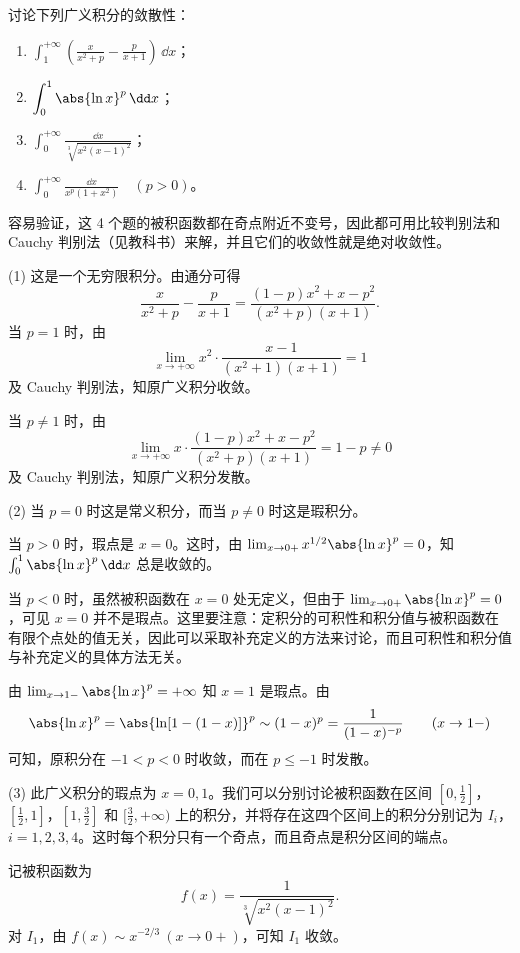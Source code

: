 \begin{xexample}[12.2.2]
讨论下列广义积分的敛散性：
\begin{enumerate}[label=(\arabic*)]
  \item $\displaystyle\int_1^{+\infty}\left(\frac{x}{x^2+p}-\frac{p}{x+1}\right)\,\dd x$；
  \item $\displaystyle\int_0^1\abs{\ln x}^p\,\dd x$；
  \item $\displaystyle\int_0^{+\infty}\frac{\dd x}{\sqrt[3]{x^2(x-1)^2}}$；
  \item $\displaystyle\int_0^{+\infty}\frac{\dd x}{x^p(1+x^2)}\quad(p>0)$。
\end{enumerate}
\end{xexample}
\begin{xsolution}
容易验证，这 4 个题的被积函数都在奇点附近不变号，因此都可用比较判别法和 Cauchy 判别法（见教科书）来解，并且它们的收敛性就是绝对收敛性。

(1) 这是一个无穷限积分。由通分可得
\[
  \frac{x}{x^2+p}-\frac{p}{x+1}
  =\frac{(1-p)x^2+x-p^2}{(x^2+p)(x+1)}.
\]
当 $p=1$ 时，由
\[
  \lim_{x\to+\infty}x^2\cdot\frac{x-1}{(x^2+1)(x+1)}=1
\]
及 Cauchy 判别法，知原广义积分收敛。

当 $p\neq1$ 时，由
\[
  \lim_{x\to+\infty}x\cdot\frac{(1-p)x^2+x-p^2}{(x^2+p)(x+1)}=1-p\neq0
\]
及 Cauchy 判别法，知原广义积分发散。

(2) 当 $p=0$ 时这是常义积分，而当 $p\neq0$ 时这是瑕积分。

当 $p>0$ 时，瑕点是 $x=0$。这时，由 $\lim_{x\to0+}x^{1/2}\abs{\ln x}^p=0$，知 $\int_0^1\abs{\ln x}^p\,\dd x$ 总是收敛的。

当 $p<0$ 时，虽然被积函数在 $x=0$ 处无定义，但由于 $\lim_{x\to0+}\abs{\ln x}^p=0$，可见 $x=0$ 并不是瑕点。这里要注意：定积分的可积性和积分值与被积函数在有限个点处的值无关，因此可以采取补充定义的方法来讨论，而且可积性和积分值与补充定义的具体方法无关。

由 $\lim_{x\to1-}\abs{\ln x}^p=+\infty$ 知 $x=1$ 是瑕点。由
\[
  \abs{\ln x}^p=\abs{\ln[1-(1-x)]}^p\sim(1-x)^p=\frac1{(1-x)^{-p}}\qquad(x\to1-)
\]
可知，原积分在 $-1<p<0$ 时收敛，而在 $p\leq-1$ 时发散。

(3) 此广义积分的瑕点为 $x=0,1$。我们可以分别讨论被积函数在区间 $[0,\frac12]$，$[\frac12,1]$，$[1,\frac32]$ 和 $[\frac32,+\infty)$ 上的积分，并将存在这四个区间上的积分分别记为 $I_i$，$i=1,2,3,4$。这时每个积分只有一个奇点，而且奇点是积分区间的端点。

记被积函数为
\[
  f(x)=\frac1{\sqrt[3]{x^2(x-1)^2}}.
\]
对 $I_1$，由 $f(x)\sim x^{-2/3}\ (x\to0+)$，可知 $I_1$ 收敛。


\end{xsolution}
